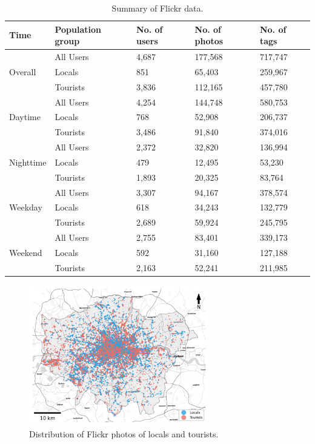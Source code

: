 \documentclass{article}
\theoremstyle{remark}
\begin{document}
\begin{table}[h!]
\centering
\caption{\label{tab:flickr_summary}Summary of Flickr data.}
\begin{tabular}{lllll} \hline
Time & Population group & No. of users & No. of photos & No. of tags \\
\hline
\multirow{3}{*}{Overall} 
& All Users & 4,687 & 177,568 & 717,747 \\
& Locals & 851 & 65,403 & 259,967 \\
& Tourists & 3,836 & 112,165 & 457,780 \\
\hline
\multirow{3}{*}{Daytime} 
& All Users & 4,254 & 144,748 & 580,753 \\
& Locals & 768 & 52,908 & 206,737 \\
& Tourists & 3,486 & 91,840 & 374,016 \\
\hline
\multirow{3}{*}{Nighttime} 
& All Users & 2,372 & 32,820 & 136,994 \\
& Locals & 479 & 12,495 & 53,230 \\
& Tourists & 1,893 & 20,325 & 83,764 \\
\hline
\multirow{3}{*}{Weekday} 
& All Users & 3,307 & 94,167 & 378,574 \\
& Locals & 618 & 34,243 & 132,779 \\
& Tourists & 2,689 & 59,924 & 245,795 \\
\hline
\multirow{3}{*}{Weekend} 
& All Users & 2,755 & 83,401 & 339,173 \\
& Locals & 592 & 31,160 & 127,188 \\
& Tourists & 2,163 & 52,241 & 211,985 \\
\hline
\end{tabular}
\end{table}

\begin{figure}[h!]
\centering
\includegraphics[width=0.7\textwidth]{figures/flickr_distribution.png}
\caption{\label{fig:flickr_distribution}Distribution of Flickr photos of locals and tourists.}
\end{figure}
\end{document}
